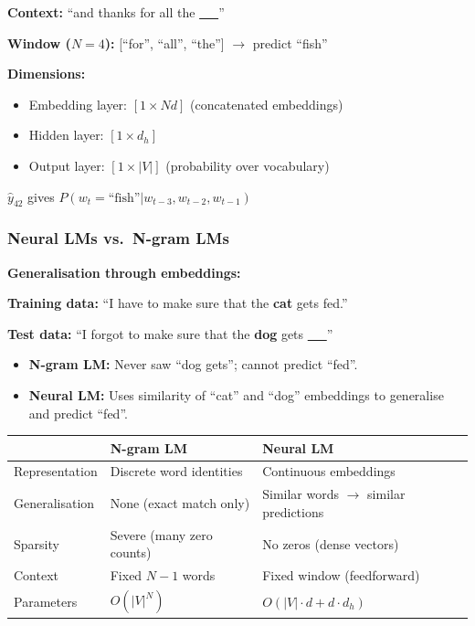 \begin{exbox}
\textbf{Context:} ``and thanks for all the \underline{~~~}''

\textbf{Window ($N=4$):} [``for'', ``all'', ``the''] $\to$ predict ``fish''

\textbf{Dimensions:}
\begin{itemize}
  \item Embedding layer: $[1 \times Nd]$ (concatenated embeddings)
  \item Hidden layer: $[1 \times d_h]$
  \item Output layer: $[1 \times |V|]$ (probability over vocabulary)
\end{itemize}

$\hat{y}_{42}$ gives $P(w_t = \text{``fish''} | w_{t-3}, w_{t-2}, w_{t-1})$
\end{exbox}

\bigseparator

\subsubsection{Neural LMs vs.\ N-gram LMs}

\begin{thmbox}
\textbf{Generalisation through embeddings:}

\textbf{Training data:} ``I have to make sure that the \textbf{cat} gets fed.''

\textbf{Test data:} ``I forgot to make sure that the \textbf{dog} gets \underline{~~~}''

\begin{itemize}
  \item \textbf{N-gram LM:} Never saw ``dog gets''; cannot predict ``fed''.
  \item \textbf{Neural LM:} Uses similarity of ``cat'' and ``dog'' embeddings to generalise and predict ``fed''.
\end{itemize}
\end{thmbox}

\begin{center}
\renewcommand{\arraystretch}{1.3}
\begin{tabular}{@{} l p{5cm} p{5cm} @{}}
\toprule
& \textbf{N-gram LM} & \textbf{Neural LM} \\
\midrule
Representation & Discrete word identities & Continuous embeddings \\
Generalisation & None (exact match only) & Similar words $\to$ similar predictions \\
Sparsity & Severe (many zero counts) & No zeros (dense vectors) \\
Context & Fixed $N-1$ words & Fixed window (feedforward) \\
Parameters & $O(|V|^N)$ & $O(|V| \cdot d + d \cdot d_h)$ \\
\bottomrule
\end{tabular}
\end{center}

